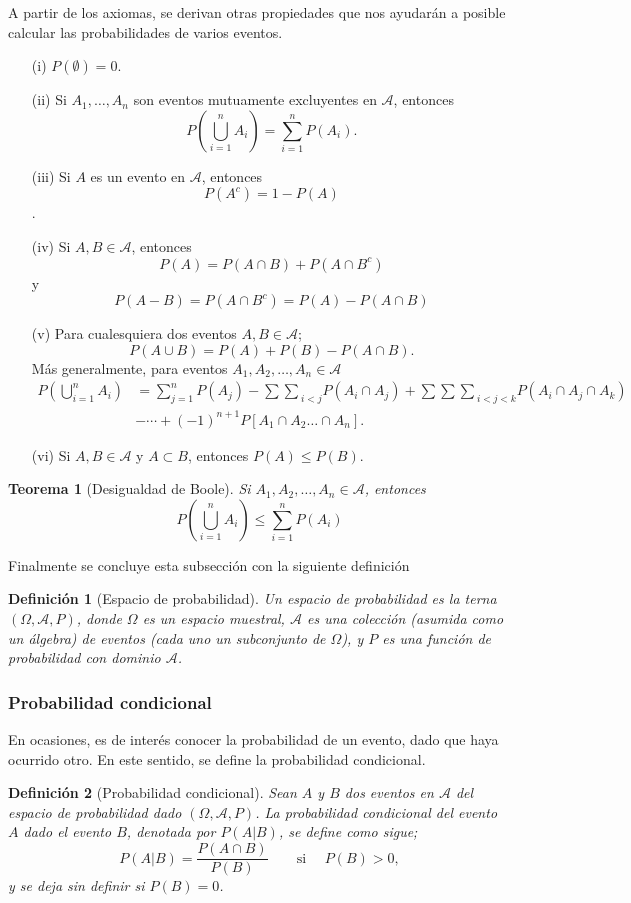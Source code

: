 \documentclass[12pt]{article}
\newtheorem{theorem}{Teorema}[section]
\newtheorem{definition}{Definición}
\begin{document}
A partir de los axiomas, se derivan otras propiedades que nos ayudarán a posible calcular las probabilidades de varios eventos.
\begin{itemize}
    \item[(i)] $P(\emptyset)=0$.
    \item[(ii)] Si $A_1, \ldots, A_n$ son eventos mutuamente excluyentes en $\mathscr A$, entonces
    $$P\left(\bigcup\limits_{i=1}^n A_i\right)= \sum\limits_{i=1}^n P(A_i).$$
    \item[(iii)] Si $A$ es un evento en $\mathscr A$, entonces $$P(A^c)= 1-P(A)$$.
    \item[(iv)] Si $A,B\in\mathscr A$, entonces 
    $$P(A)= P(A\cap B)+ P(A\cap B^c)$$
    y $$P(A-B)=P(A\cap B^c)= P(A)-P(A\cap B)$$
    \item[(v)] Para cualesquiera dos eventos $A,B\in \mathscr A$;
    $$P(A\cup B)= P(A)+P(B)-P(A\cap B).$$
    Más generalmente, para eventos $A_1, A_2, \ldots, A_n\in \mathscr A$
    \begin{align*}
        P(\bigcup\limits_{i=1}^n A_i)&= \sum_{j=1}^n P(A_j)-{\sum\sum}_{i<j} P(A_i\cap A_j)+{\sum\sum\sum}_{i<j<k} P(A_i\cap A_j\cap A_k)\\
        &-\cdots+(-1)^{n+1}P[A_1\cap A_2\ldots\cap A_n].
    \end{align*}
    \item[(vi)] Si $A,B\in \mathscr A$ y $A\subset B$, entonces $P(A)\leq P(B)$.
\end{itemize}
\begin{theorem}[Desigualdad de Boole]
    Si $A_1, A_2, \ldots, A_n\in\mathscr A$, entonces
    $$P\left(\bigcup_{i=1}^n A_i\right)\leq \sum_{i=1}^n P(A_i)$$
\end{theorem}
Finalmente se concluye esta subsección con la siguiente definición
\begin{definition}[Espacio de probabilidad]
    Un espacio de probabilidad es la terna $(\Omega, \mathscr A, P)$, donde $\Omega$ es un espacio muestral, $\mathscr A$ es una colección (asumida como un álgebra) de eventos (cada uno un subconjunto de $\Omega$), y $P$ es una función de probabilidad con dominio $\mathscr A$.
\end{definition}

\subsubsection{Probabilidad condicional}
En ocasiones, es de interés conocer la probabilidad de un evento, dado que haya ocurrido otro. En este sentido, se define la probabilidad condicional.
\begin{definition}[Probabilidad condicional]
    Sean $A$ y $B$ dos eventos en $\mathscr A$ del espacio de probabilidad dado $(\Omega, \mathscr A, P)$. La probabilidad condicional del evento $A$ dado el evento $B$, denotada por $P(A|B)$, se define como sigue;
    $$P(A|B)= \frac{P(A\cap B)}{P(B)}\qquad\text{si }\quad P(B)>0,$$
    y se deja sin definir si $P(B)=0$.
\end{definition}
\end{document}
